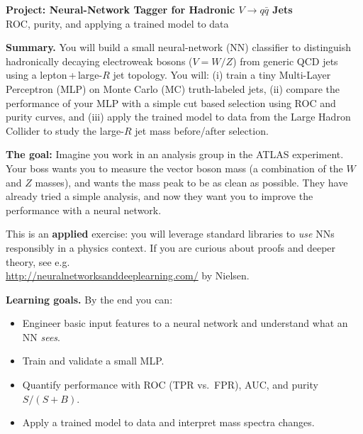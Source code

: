 \documentclass[11pt]{article}
\begin{document}
\begin{center}
  {\Large \textbf{Project: Neural-Network Tagger for Hadronic $V\!\to q\bar q$ Jets}}\\[6pt]
  {\large ROC, purity, and applying a trained model to data}
\end{center}

\vspace{0.75em}

\noindent\textbf{Summary.}
You will build a small neural-network (NN) classifier to distinguish hadronically decaying electroweak bosons ($V=W/Z$) from generic QCD jets using a lepton\,+\,large-$R$ jet topology. You will:
(i) train a tiny Multi-Layer Perceptron (MLP) on Monte Carlo (MC) truth-labeled jets, (ii) compare the performance of your MLP with a simple cut based selection using ROC and purity curves, and (iii) apply the trained model to data from the Large Hadron Collider to study the large-$R$ jet mass before/after selection.

\textbf{The goal: }Imagine you work in an analysis group in the ATLAS experiment. Your boss wants you to measure the vector boson mass (a combination of the $W$ and $Z$ masses), and wants the mass peak to be as clean as possible. They have already tried a simple analysis, and now they want you to improve the performance with a neural network.

This is an \textbf{applied} exercise: you will leverage standard libraries to \emph{use} NNs responsibly in a physics context. If you are curious about proofs and deeper theory, see e.g.\\ \url{http://neuralnetworksanddeeplearning.com/} by Nielsen.

\medskip

\noindent\textbf{Learning goals.}
By the end you can:
\begin{itemize}[leftmargin=1.5em]
  \item Engineer basic input features to a neural network and understand what an NN \emph{sees}.
  \item Train and validate a small MLP.
  \item Quantify performance with ROC (TPR vs.\ FPR), AUC, and purity $S/(S{+}B)$.
  \item Apply a trained model to data and interpret mass spectra changes.
\end{itemize}
\end{document}
